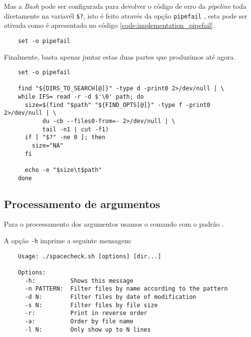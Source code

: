 Mas a \emph{Bash} pode ser configurada para devolver o código de erro da
\emph{pipeline} toda diretamente na variavél \Verb|$?|, isto é feito através da
opção \Verb|pipefail| \cite{bash_man}, esta pode ser ativada como é apresentado
no código \ref{code:implementation_pipefail}.

\begin{listing}[H]
	\centering
	\begin{verbatim}
    set -o pipefail
  \end{verbatim}
	\cprotect\caption{Ativação da opção \Verb|pipefail|}
	\label{code:implementation_pipefail}
\end{listing}

Finalmente, basta apenas juntar estas duas partes que produzimos até agora.

\begin{listing}[H]
	\centering
	\begin{verbatim}
    set -o pipefail

    find "${DIRS_TO_SEARCH[@]}" -type d -print0 2>/dev/null | \
    while IFS= read -r -d $'\0' path; do
      size=$(find "$path" "${FIND_OPTS[@]}" -type f -print0  2>/dev/null | \
           du -cb --files0-from=- 2>/dev/null | \
           tail -n1 | cut -f1)
      if [ "$?" -ne 0 ]; then
        size="NA"
      fi

      echo -e "$size\t$path"
    done
  \end{verbatim}
	\cprotect\caption{Implementação do algoritmo principal do \Verb|spacecheck.sh|}
\end{listing}

\subsection{Processamento de argumentos}\label{sec:implementation_arg_parsing}

Para o processamento dos argumentos usamos o comando  com o padrão .

A opção \Verb|-h| imprime a seguinte mensagem:

\begin{listing}[H]
	\centering
	\begin{verbatim}
    Usage: ./spacecheck.sh [options] [dir...]

    Options:
      -h:          Shows this message
      -n PATTERN:  Filter files by name according to the pattern
      -d N:        Filter files by date of modification
      -s N:        Filter files by file size
      -r:          Print in reverse order
      -a:          Order by file name
      -l N:        Only show up to N lines
  \end{verbatim}
\end{listing}

